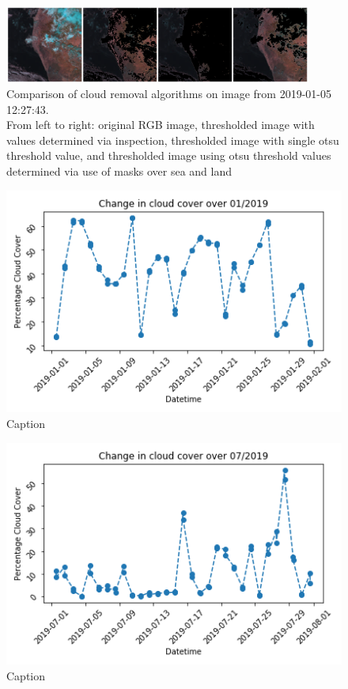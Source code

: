 \begin{figure}
    \centering
    \includegraphics[width=0.9\textwidth]{compare_removal.png}
    \caption{Comparison of cloud removal algorithms on image from 2019-01-05 12:27:43.
    \\From left to right: original RGB image, thresholded image with values determined via inspection, thresholded image with single otsu threshold value, and thresholded image using otsu threshold values determined via use of masks over sea and land}
    \label{fig:iterav}
\end{figure}


\begin{figure}[H]
    \centering
    \includegraphics[totalheight=0.3\textheight]{cloud_percent_jan_southsea.png}
    \caption{Caption}
    \label{fig:my_label}
\end{figure}


\begin{figure}[H]
    \centering
    \includegraphics[totalheight=0.3\textheight]{cloud_percent_jul_southsea.png}
    \caption{Caption}
    \label{fig:my_label}
\end{figure}

